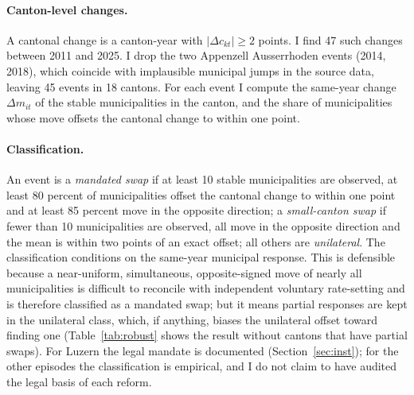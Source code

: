 \documentclass[11pt,a4paper]{article}
\begin{document}
\paragraph{Canton-level changes.} A cantonal change is a canton-year with $|\Delta c_{kt}|\ge 2$ points. I find 47 such changes between 2011 and 2025. I drop the two Appenzell Ausserrhoden events (2014, 2018), which coincide with implausible municipal jumps in the source data, leaving 45 events in 18 cantons. For each event I compute the same-year change $\Delta m_{it}$ of the stable municipalities in the canton, and the share of municipalities whose move offsets the cantonal change to within one point.

\paragraph{Classification.} An event is a \emph{mandated swap} if at least 10 stable municipalities are observed, at least 80 percent of municipalities offset the cantonal change to within one point and at least 85 percent move in the opposite direction; a \emph{small-canton swap} if fewer than 10 municipalities are observed, all move in the opposite direction and the mean is within two points of an exact offset; all others are \emph{unilateral}. The classification conditions on the same-year municipal response. This is defensible because a near-uniform, simultaneous, opposite-signed move of nearly all municipalities is difficult to reconcile with independent voluntary rate-setting and is therefore classified as a mandated swap; but it means partial responses are kept in the unilateral class, which, if anything, biases the unilateral offset toward finding one (Table~\ref{tab:robust} shows the result without cantons that have partial swaps). For Luzern the legal mandate is documented (Section~\ref{sec:inst}); for the other episodes the classification is empirical, and I do not claim to have audited the legal basis of each reform.
\end{document}
